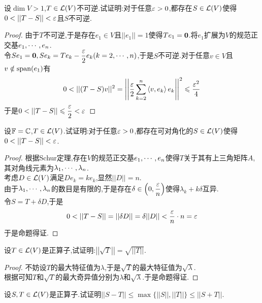 \documentclass{ctexart}
\begin{document}
\begin{problem}[10.]
    设$\dim V>1$,$T\in\mathcal{L}(V)$不可逆.试证明:对于任意$\varepsilon>0$,都存在$S\in\mathcal{L}(V)$使得$0<||T-S||<\ep$且$S$不可逆.
\end{problem}
\begin{proof}
    由于$T$不可逆,于是存在$e_1\in V$且$||e_1||=1$使得$Te_1=\mathbf0$.将$e_1$扩展为$V$的规范正交基${e}_1,\cdots,{e}_{n}$.\\
    令$Se_1=\mathbf0,Se_k=Te_k-\dfrac{\varepsilon}{2}e_k(k=2,\cdots,n)$,于是$S$不可逆.对于任意$v\in V$且$v\notin\text{span}(e_1)$有
    \[0<||(T-S)v||^2=\left|\left|\dfrac{\ep}{2}\sum_{k=2}^{n}\inprod{v}{e_k}e_k\right|\right|^2\leqslant\dfrac{\ep^2}{4}\]
    于是$0<||T-S||\leqslant\dfrac\ep2<\ep$
\end{proof}
\begin{problem}[11.]
    设$\mathbb{F}=\mathbb{C}$,$T\in\mathcal{L}(V)$.试证明:对于任意$\varepsilon>0$,都存在可对角化的$S\in\mathcal{L}(V)$使得$0<||T-S||<\ep$.
\end{problem}
\begin{proof}
    根据Schur定理,存在$V$的规范正交基${e}_1,\cdots,{e}_{n}$使得$T$关于其有上三角矩阵$A$,其对角线元素为${\lambda}_1,\cdots,{\lambda}_{n}$.\\
    考虑$D\in\mathcal{L}(V)$满足$De_k=ke_k$,显然$||D||=n$.\\
    由于${\lambda}_1,\cdots,{\lambda}_{n}$的数目是有限的,于是存在$\delta\in\left(0,\dfrac{\varepsilon}{n}\right)$使得$\lambda_k+k\delta$互异.\\
    令$S=T+\delta D$,于是
    \[0<||T-S||=||\delta D||=\delta||D||<\dfrac{\ep}{n}\cdot n=\ep\]
    于是命题得证.
\end{proof}
\begin{problem}[12.]
    设$T\in\mathcal{L}(V)$是正算子,试证明:$\left|\left|\sqrt{T}\right|\right|=\sqrt{\left|\left|T\right|\right|}$.
\end{problem}
\begin{proof}
    不妨设$T$的最大特征值为$\lambda$,于是$\sqrt{T}$的最大特征值为$\sqrt{\lambda}$.\\
    根据可知$T$和$\sqrt{T}$的最大奇异值分别为$\lambda$和$\sqrt{\lambda}$.于是命题得证.
\end{proof}
\begin{problem}[13.]
    设$S,T\in\mathcal{L}(V)$是正算子.试证明$||S-T||\leqslant\max\{||S||,||T||\}\leqslant||S+T||$.
\end{problem}
\begin{lemma}[Lemma.L.]
    
\end{lemma}
\end{document}
